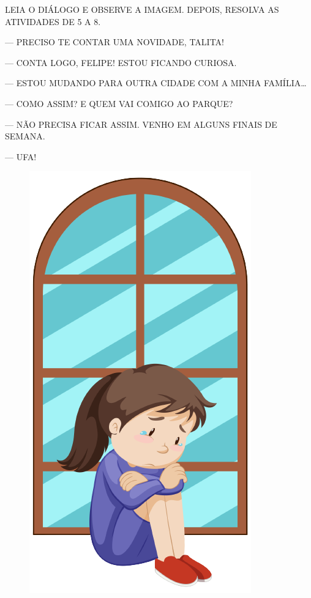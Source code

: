 LEIA O DIÁLOGO E OBSERVE A IMAGEM. DEPOIS, RESOLVA
AS ATIVIDADES DE 5 A 8.


\vspace{1cm}

\begin{minipage}{.7\textwidth}
\begin{myquote}
--- PRECISO TE CONTAR UMA NOVIDADE, TALITA!

--- CONTA LOGO, FELIPE! ESTOU FICANDO CURIOSA.

--- ESTOU MUDANDO PARA OUTRA CIDADE COM A MINHA FAMÍLIA\ldots{}

--- COMO ASSIM? E QUEM VAI COMIGO AO PARQUE?

--- NÃO PRECISA FICAR ASSIM. VENHO EM ALGUNS FINAIS DE SEMANA.

--- UFA!
\end{myquote}
\end{minipage}
\begin{minipage}{.5\textwidth}
\begin{figure}[H]
\includegraphics[width=.5\textwidth]{media/image173a.png}
\end{figure}
\end{minipage}

\vspace{1cm}

